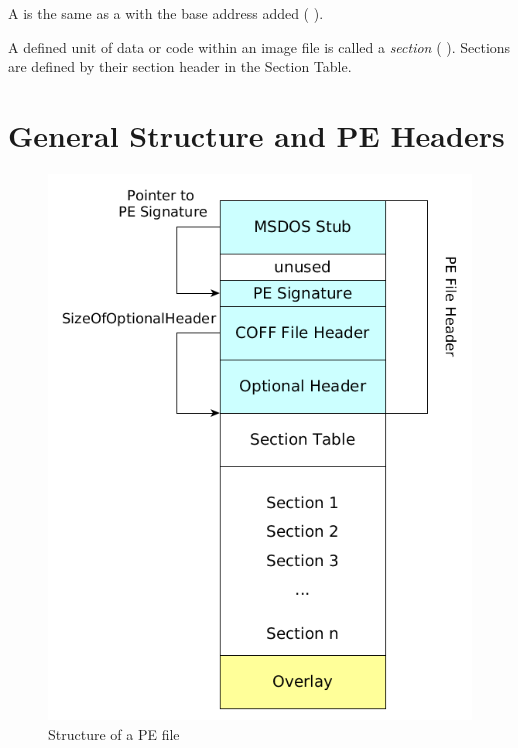 \begin{definition}[VA]
A \emph{\VA{}} is the same as a \RVA{} with the base address added (\cf{} \cite[]{pespec}).
\end{definition} 

\begin{definition}[section]
A defined unit of data or code within an image file is called a \emph{section} (\cf{} \cite[]{pespec}). Sections are defined by their section header in the Section Table.
\end{definition} 

\section{General Structure and PE Headers}

\begin{figure}
\includegraphics[width=.98\textwidth, height=.60\textheight,keepaspectratio]{graphics/peformat}
\caption{Structure of a PE file}
\label{fig:peformat} 
\end{figure}

